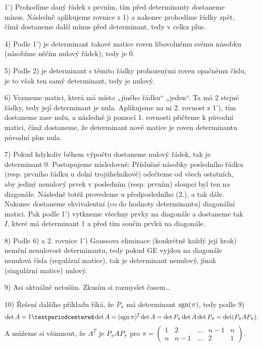 \documentclass[12pt]{article}					%
\begin{document}
\begin{priklad}[9.1]
        \begin{dukazin}
            \begin{itemize}
                \item[1')] Prohodíme daný řádek s prvním, tím před determinanty dostaneme mínus. Následně aplikujeme rovnice z 1) a nakonec prohodíme řádky zpět, čímž dostaneme další mínus před determinant, tedy v celku plus.
                \item[4)] Podle 1') je determinant takové matice roven libovolnému svému násobku (násobíme něčím nulový řádek), tedy je $0$.
                \item[5)] Podle 2) je determinant s těmito řádky prohozenými roven opačnému číslu, je to však ten samý determinant, tedy je nulový.
                \item[6)] Vezmeme matici, která má místo „jiného řádku“ „jeden“. Ta má 2 stejné řádky, tedy její determinant je nula. Aplikujeme na ni 2. rovnost z 1'), tím dostaneme zase nulu, a následně ji pomocí 1. rovnosti přičteme k původní matici, čímž dostaneme, že determinant nové matice je roven determinantu původní plus nula.
                \item[7)] Pokud kdykoliv během výpočtu dostaneme nulový řádek, tak je determinant 0. Postupujeme následovně: Příslušné násobky posledního řádku (resp. prvního řádku u dolní trojúhelníkové) odečteme od všech ostatních, aby jediný nenulový prvek v posledním (resp. prvním) sloupci byl ten na diagonále. Následně totéž provedeme u předposledního (2.), a tak dále. Nakonec dostaneme ekvivalentní (co do hodnoty determinantu) diagonální matici. Pak podle 1') vytkneme všechny prvky na diagonále a dostaneme tak $I$, které má determinant 1 a před tím součin prvků na diagonále.
                \item[8)] Podle 6) a 2. rovnice 1') Gaussova eliminace (konkrétně každý její krok) nemění nenulovost determinantu, tedy pokud GE vyjdou na diagonále nenulová čísla (regulární matice), tak je determinant nenulový, jinak (singulární matice) nulový.
                \item[9)] Asi aktuálně netuším. Zkusím si rozmyslet časem…
                \item[10)] Řešení dalšího příkladu říká, že $P_\pi$ má determinant $\operatorname{sgn}(\pi)$, tedy podle 9)
                    $$ \det A = 1·\det A = (\sgn \pi)^2\det A = \det P_\pi \det A \det P_\pi = \det(P_\pi A P_\pi). $$
                    A můžeme si všimnout, že $A^T$ je $P_\pi A P_\pi$ pro $\pi = \begin{pmatrix} 1 & 2 & … & n-1 & n \\ n & n-1 & … & 2 & 1 \end{pmatrix}$.
            \end{itemize}
        \end{dukazin}
    \end{priklad}
\end{document}
